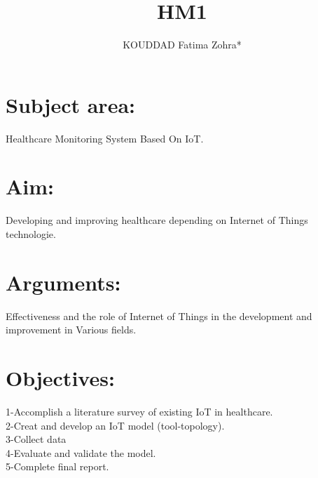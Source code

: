 \documentclass[11pt]{article}
\begin{document}
\title{HM1} 
\author{KOUDDAD Fatima Zohra* } 
\maketitle

\section{Subject area:}
Healthcare Monitoring System  Based On IoT. \\
\section{Aim:}

  Developing and improving healthcare depending  on Internet of Things technologie. \\
\section{Arguments:} 
Effectiveness and the role of Internet of Things in the development and improvement in Various fields.
 \\
\section{Objectives:} 

   1-Accomplish a literature survey of existing IoT in healthcare. \\
   2-Creat and develop an IoT model (tool-topology). \\
   3-Collect data \\
   4-Evaluate and validate the model. \\
   5-Complete final report. \\
    \\
\end{document}
